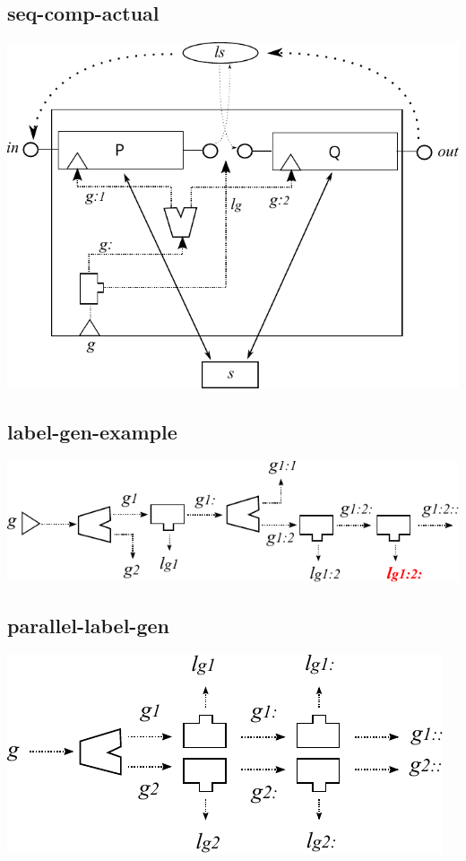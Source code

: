 \subsection{seq-comp-actual}
\includegraphics{images/seq-comp-actual}

\subsection{label-gen-example}
\includegraphics{images/label-gen-example}

\subsection{parallel-label-gen}
\includegraphics{images/parallel-label-gen}

